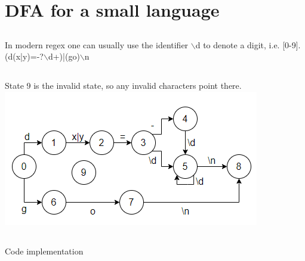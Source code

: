 \documentclass{article}
\begin{document}
\section{DFA for a small language}
\subsection{}
In modern regex one can usually use the identifier $\backslash$d to denote a digit, i.e. [0-9].\\
(d(x|y)=-?$\backslash$d+)|(go)$\backslash$n

\subsection{}
State 9 is the invalid state, so any invalid characters point there.\\
\includegraphics{grpah.png}
\subsection{}
Code implementation
\end{document}
